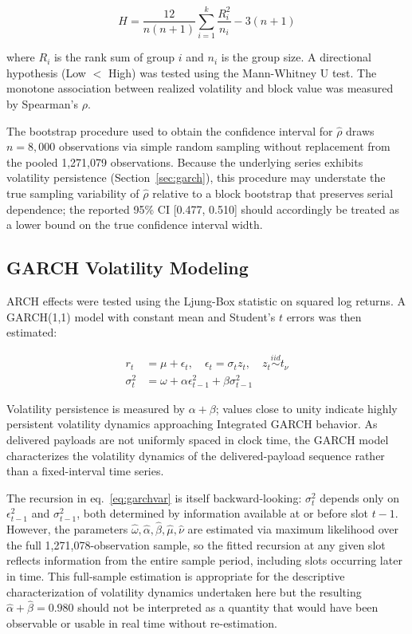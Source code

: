 \documentclass[11pt]{article}
\begin{document}
\begin{equation}
H = \frac{12}{n(n+1)} \sum_{i=1}^{k} \frac{R_i^2}{n_i} - 3(n+1)
\label{eq:kruskalwallis}
\end{equation}

where $R_i$ is the rank sum of group $i$ and $n_i$ is the group size. A
directional hypothesis (Low $<$ High) was tested using the Mann-Whitney U test.
The monotone association between realized volatility and block value was measured
by Spearman's $\rho$.

The bootstrap procedure used to obtain the confidence interval for
$\hat\rho$ draws $n=8{,}000$ observations via simple random sampling without
replacement from the pooled 1,271,079 observations. Because the underlying
series exhibits volatility persistence (Section~\ref{sec:garch}), this
procedure may understate the true sampling variability of
$\hat\rho$ relative to a block bootstrap that preserves serial dependence; the
reported 95\% CI [0.477, 0.510] should accordingly be treated as a lower bound
on the true confidence interval width.

\subsection{GARCH Volatility Modeling}

ARCH effects were tested using the Ljung-Box statistic on squared log returns.
A GARCH(1,1) model with constant mean and Student's $t$ errors was then
estimated:

\begin{align}
r_t &= \mu + \epsilon_t, \quad \epsilon_t = \sigma_t z_t, \quad z_t \overset{iid}{\sim} t_\nu \label{eq:garchmean} \\
\sigma_t^2 &= \omega + \alpha \epsilon_{t-1}^2 + \beta \sigma_{t-1}^2 \label{eq:garchvar}
\end{align}

Volatility persistence is measured by $\alpha + \beta$; values close to unity
indicate highly persistent volatility dynamics approaching Integrated GARCH
behavior. As delivered payloads are not uniformly spaced in clock time, the
GARCH model characterizes the volatility dynamics of the delivered-payload
sequence rather than a fixed-interval time series.

The recursion in eq.~\ref{eq:garchvar} is itself backward-looking: $\sigma_t^2$
depends only on $\epsilon_{t-1}^2$ and $\sigma_{t-1}^2$, both determined by
information available at or before slot $t-1$. However, the parameters
$\hat\omega, \hat\alpha, \hat\beta, \hat\mu, \hat\nu$ are estimated via maximum
likelihood over the full 1,271,078-observation sample, so the fitted recursion
at any given slot reflects information from the entire sample period, including
slots occurring later in time. This full-sample estimation is appropriate for
the descriptive characterization of volatility dynamics undertaken here but the
resulting $\hat\alpha+\hat\beta=0.980$ should not be interpreted as a quantity
that would have been observable or usable in real time without re-estimation.
\end{document}
